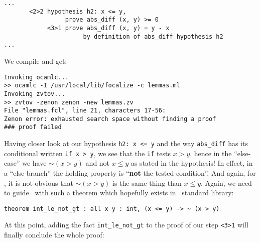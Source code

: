 \documentclass[11pt,a4paper,twoside,onecolumn,fullpage]{article}
\begin{document}
{\scriptsize
\begin{lstlisting}
...
       <2>2 hypothesis h2: x <= y,
                 prove abs_diff (x, y) >= 0
            <3>1 prove abs_diff (x, y) = y - x
                      by definition of abs_diff hypothesis h2
...
\end{lstlisting}}

\noindent We compile and get:

{\scriptsize
\begin{verbatim}
Invoking ocamlc...
>> ocamlc -I /usr/local/lib/focalize -c lemmas.ml
Invoking zvtov...
>> zvtov -zenon zenon -new lemmas.zv
File "lemmas.fcl", line 21, characters 17-56:
Zenon error: exhausted search space without finding a proof
### proof failed
\end{verbatim}}

Having closer look at our hypothesis \lstinline"h2: x <= y" and the
way \lstinline"abs_diff" has its conditional written
\lstinline"if x > y", we see that the \lstinline"if" tests $x >y$,
hence in the ``else-case'' we have $\sim (x >y)$ and not $x \le y$ as
stated in the hypothesis! In effect, in a ``else-branch'' the holding
property is ``{\bf not}-the-tested-condition''. And again, for \zenon,
it is not obvious that $\sim (x >y)$ is the same thing than $x \le y$.
Again, we need to guide \zenon\ with such a theorem which hopefully
exists in \focal\ standard library:

{\scriptsize
\begin{lstlisting}
theorem int_le_not_gt : all x y : int, (x <= y) -> ~ (x > y)
\end{lstlisting}}

At this point, adding the fact \lstinline"int_le_not_gt" to the proof
of our step \lstinline"<3>1" will finally conclude the whole proof:

{\scriptsize
}






\end{document}
